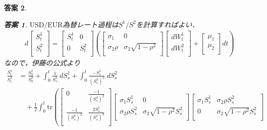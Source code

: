 \documentclass[11pt,a4paper]{jsarticle}
\theoremstyle{mystyle}
\newtheorem*{ans}{答案}
\begin{document}
\begin{ans}
\begin{ans}
	$\mbox{USD}/\mbox{EUR}$為替レート過程は$S^{1}/S^{2}$を計算すればよい．
	\begin{align}
		d\begin{bmatrix}
			S^{1}_{t} \\
			S^{2}_{t} \\
		\end{bmatrix} = 
		\begin{bmatrix}
			S^{1}_{t} & 0 \\
			0 & S^{2}_{t} \\
		\end{bmatrix}
		\left(
		\begin{bmatrix}
			\sigma_{1} & 0 \\
			\sigma_{2}\rho & \sigma_{2}\sqrt{1-\rho^{2}} \\
		\end{bmatrix}
		\begin{bmatrix}
			dW^{1}_{t} \\
			dW^{2}_{t} \\
		\end{bmatrix}
		+ 
		\begin{bmatrix}
			\mu_{1} \\
			\mu_{2} \\
		\end{bmatrix}
		dt
		\right)
	\end{align}
	なので，伊藤の公式より
	\begin{align}
		\frac{S^{1}_{t}}{S^{2}_{t}} 
		&= \frac{S^{1}_{0}}{S^{2}_{0}} + \int_{0}^{t} \frac{1}{S^{2}_{s}}\ dS^{1}_{s}
		+ \int_{0}^{t} \frac{-S^{1}_{s}}{(S^{2}_{s})^{2}}\ dS^{2}_{s} \\
		&\quad + \frac{1}{2}\int_{0}^{t} \mbox{tr}\left(
		\begin{bmatrix}
			0 & \frac{-1}{(S^{2}_{s})^{2}} \\
			\frac{-1}{(S^{2}_{s})^{2}} & \frac{2S^{1}_{s}}{(S^{2}_{s})^{3}} \\
		\end{bmatrix}
		\begin{bmatrix}
			\sigma_{1}S^{1}_{s} & 0 \\
			\sigma_{2}\rho S^{2}_{s} & \sigma_{2}\sqrt{1-\rho^{2}}S^{2}_{s} \\
		\end{bmatrix}
		\begin{bmatrix}
			\sigma_{1}S^{1}_{s} & \sigma_{2}\rho S^{2}_{s} \\
			0 & \sigma_{2}\sqrt{1-\rho^{2}}S^{2}_{s} \\

\end{bmatrix}
\end{align}
\end{ans}
\end{ans}
\end{document}
